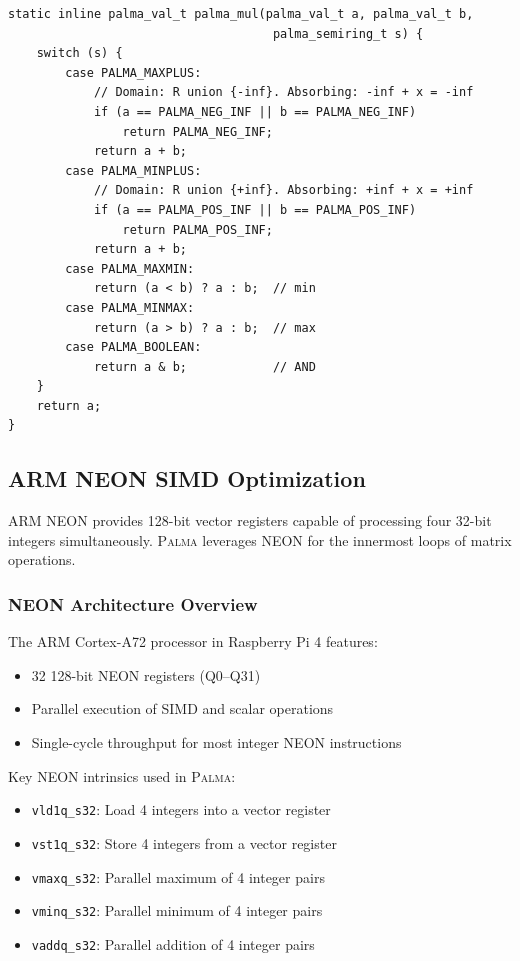 \documentclass[11pt,a4paper]{article}
\theoremstyle{plain}
\theoremstyle{definition}
\newcommand{\palma}{\textsc{Palma}}
\begin{document}
\begin{lstlisting}[caption={Semiring multiplication with infinity handling}]
static inline palma_val_t palma_mul(palma_val_t a, palma_val_t b,
                                     palma_semiring_t s) {
    switch (s) {
        case PALMA_MAXPLUS:
            // Domain: R union {-inf}. Absorbing: -inf + x = -inf
            if (a == PALMA_NEG_INF || b == PALMA_NEG_INF)
                return PALMA_NEG_INF;
            return a + b;
        case PALMA_MINPLUS:
            // Domain: R union {+inf}. Absorbing: +inf + x = +inf
            if (a == PALMA_POS_INF || b == PALMA_POS_INF)
                return PALMA_POS_INF;
            return a + b;
        case PALMA_MAXMIN:
            return (a < b) ? a : b;  // min
        case PALMA_MINMAX:
            return (a > b) ? a : b;  // max
        case PALMA_BOOLEAN:
            return a & b;            // AND
    }
    return a;
}
\end{lstlisting}

\subsection{ARM NEON SIMD Optimization}
\label{subsec:neon}

ARM NEON provides 128-bit vector registers capable of processing four 32-bit integers simultaneously. \palma{} leverages NEON for the innermost loops of matrix operations.

\subsubsection{NEON Architecture Overview}

The ARM Cortex-A72 processor in Raspberry Pi 4 features:
\begin{itemize}
    \item 32 128-bit NEON registers (Q0--Q31)
    \item Parallel execution of SIMD and scalar operations
    \item Single-cycle throughput for most integer NEON instructions
\end{itemize}

Key NEON intrinsics used in \palma{}:
\begin{itemize}
    \item \texttt{vld1q\_s32}: Load 4 integers into a vector register
    \item \texttt{vst1q\_s32}: Store 4 integers from a vector register
    \item \texttt{vmaxq\_s32}: Parallel maximum of 4 integer pairs
    \item \texttt{vminq\_s32}: Parallel minimum of 4 integer pairs
    \item \texttt{vaddq\_s32}: Parallel addition of 4 integer pairs
\end{itemize}
\end{document}
